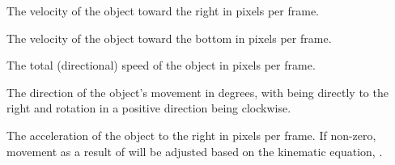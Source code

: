 \documentclass[letterpaper,10pt,english]{sphinxmanual}
\begin{document}
\begin{fulllineitems}
\begin{fulllineitems}
\end{fulllineitems}


\begin{fulllineitems}
\label{dsp:sge.dsp.Object.xvelocity}
The velocity of the object toward the right in pixels per frame.

\end{fulllineitems}


\begin{fulllineitems}
\label{dsp:sge.dsp.Object.yvelocity}
The velocity of the object toward the bottom in pixels per frame.

\end{fulllineitems}


\begin{fulllineitems}
\label{dsp:sge.dsp.Object.speed}
The total (directional) speed of the object in pixels per frame.

\end{fulllineitems}


\begin{fulllineitems}
\label{dsp:sge.dsp.Object.move_direction}
The direction of the object's movement in degrees, with 
being directly to the right and rotation in a positive direction
being clockwise.

\end{fulllineitems}


\begin{fulllineitems}
\label{dsp:sge.dsp.Object.xacceleration}
The acceleration of the object to the right in pixels per frame.
If non-zero, movement as a result of {\hyperref[dsp:sge.dsp.Object.xvelocity]{\emph{}}} will be
adjusted based on the kinematic equation,
.

\end{fulllineitems}


\end{fulllineitems}
\end{document}
